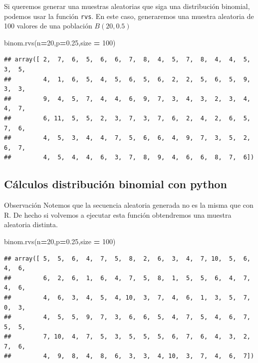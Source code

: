 \documentclass[]{book}
\newenvironment{Shaded}{\begin{snugshade}}{\end{snugshade}}
\newcommand{\DecValTok}[1]{\textcolor[rgb]{0.00,0.00,0.81}{#1}}
\newcommand{\FloatTok}[1]{\textcolor[rgb]{0.00,0.00,0.81}{#1}}
\newcommand{\NormalTok}[1]{#1}
\newcommand{\OperatorTok}[1]{\textcolor[rgb]{0.81,0.36,0.00}{\textbf{#1}}}
\begin{document}
Si queremos generar una muestras aleatorias que siga una distribución binomial, podemos usar la función \texttt{rvs}. En este caso, generaremos una muestra aleatoria de 100 valores de una población \(B(20,0.5)\)

\begin{Shaded}
\begin{Highlighting}[]
\NormalTok{binom.rvs(n}\OperatorTok{=}\DecValTok{20}\NormalTok{,p}\OperatorTok{=}\FloatTok{0.25}\NormalTok{,size }\OperatorTok{=} \DecValTok{100}\NormalTok{)}
\end{Highlighting}
\end{Shaded}

\begin{verbatim}
## array([ 2,  7,  6,  5,  6,  6,  7,  8,  4,  5,  7,  8,  4,  4,  5,  3,  5,
##         4,  1,  6,  5,  4,  5,  6,  5,  6,  2,  2,  5,  6,  5,  9,  3,  3,
##         9,  4,  5,  7,  4,  4,  6,  9,  7,  3,  4,  3,  2,  3,  4,  4,  7,
##         6, 11,  5,  5,  2,  3,  7,  3,  7,  6,  2,  4,  2,  6,  5,  7,  6,
##         4,  5,  3,  4,  4,  7,  5,  6,  6,  4,  9,  7,  3,  5,  2,  6,  7,
##         4,  5,  4,  4,  6,  3,  7,  8,  9,  4,  6,  6,  8,  7,  6])
\end{verbatim}

\hypertarget{cuxe1lculos-distribuciuxf3n-binomial-con-python-4}{%
\subsection{Cálculos distribución binomial con python}\label{cuxe1lculos-distribuciuxf3n-binomial-con-python-4}}

 Observación
Notemos que la secuencia aleatoria generada no es la misma que con R. De hecho si volvemos a ejecutar esta función obtendremos una muestra aleatoria distinta.

\begin{Shaded}
\begin{Highlighting}[]
\NormalTok{binom.rvs(n}\OperatorTok{=}\DecValTok{20}\NormalTok{,p}\OperatorTok{=}\FloatTok{0.25}\NormalTok{,size }\OperatorTok{=} \DecValTok{100}\NormalTok{)}
\end{Highlighting}
\end{Shaded}

\begin{verbatim}
## array([ 5,  5,  6,  4,  7,  5,  8,  2,  6,  3,  4,  7, 10,  5,  6,  4,  6,
##         6,  2,  6,  1,  6,  4,  7,  5,  8,  1,  5,  5,  6,  4,  7,  4,  6,
##         4,  6,  3,  4,  5,  4, 10,  3,  7,  4,  6,  1,  3,  5,  7,  0,  3,
##         4,  5,  5,  9,  7,  3,  6,  6,  5,  4,  7,  5,  4,  6,  7,  5,  5,
##         7, 10,  4,  7,  5,  3,  5,  5,  5,  6,  7,  6,  4,  3,  2,  7,  6,
##         4,  9,  8,  4,  8,  6,  3,  3,  4, 10,  3,  7,  4,  6,  7])
\end{verbatim}
\end{document}
